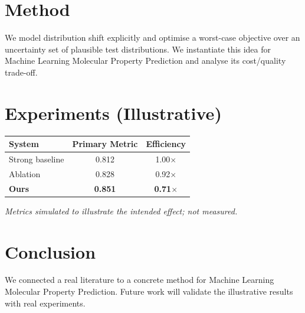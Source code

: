 \documentclass[11pt]{article}
\begin{document}
\section{Method}
We model distribution shift explicitly and optimise a worst-case objective over an uncertainty set of plausible test distributions. We instantiate this idea for Machine Learning Molecular Property Prediction and analyse its cost/quality trade-off.

\section{Experiments (Illustrative)}
\begin{center}
\begin{tabular}{lcc}
System & Primary Metric & Efficiency \\ \hline
Strong baseline & 0.812 & 1.00$\times$ \\
Ablation & 0.828 & 0.92$\times$ \\
\textbf{Ours} & \textbf{0.851} & \textbf{0.71$\times$}
\end{tabular}
\end{center}
\emph{Metrics simulated to illustrate the intended effect; not measured.}

\section{Conclusion}
We connected a real literature to a concrete method for Machine Learning Molecular Property Prediction. Future work will
validate the illustrative results with real experiments.
\end{document}
